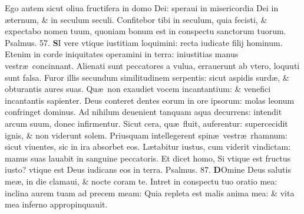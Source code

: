 \documentclass[a5paper,10pt]{book}
\def\ae{æ}
\begin{document}
\begin{multicols*}{2}
\newline \color{red} E\color{black}go autem sicut oliua fructifera in domo Dei: speraui in misericordia Dei in \ae ternum, \& in seculum seculi.
\newline \color{red} C\color{black}onfitebor tibi in seculum, quia fecisti, \& expectabo nomen tuum, quoniam bonum est in conspectu sanctorum tuorum. \quad \color{red} Psalmus. \hypertarget{ps57}{57.} \color{black}
\lettrine[lines=2]{\bfseries \color{red} S}{}I vere vtique iustitiam loquimini: recta iudicate filij hominum.
\newline \color{red} E\color{black}tenim in corde iniquitates operamini in terra: iniustitias manus vestr\ae \ concinnant.
\newline \color{red} A\color{black}lienati sunt peccatores a vulua, errauerunt ab vtero, loquuti sunt falsa.
\newline \color{red} F\color{black}uror illis secundum similitudinem serpentis: sicut aspidis surd\ae , \& obturantis aures suas.
\newline \color{red} Q\color{black}u\ae \ non exaudiet vocem incantantium: \& venefici incantantis sapienter.
\newline \color{red} D\color{black}eus conteret dentes eorum in ore ipsorum: molas leonum confringet dominus.
\newline \color{red} A\color{black}d nihilum deuenient tanquam aqua decurrens: intendit arcum suum, donec infirmentur.
\newline \color{red} S\color{black}icut cera, qu\ae \ fluit, auferentur: supercecidit ignis, \& non viderunt solem.
\newline \color{red} P\color{black}riusquam intellegerent spin\ae \ vestr\ae \ rhamnum: sicut viuentes, sic in ira absorbet eos.
\newline \color{red} L\color{black}\ae tabitur iustus, cum viderit vindictam: manus suas lauabit in sanguine peccatoris.
\newline \color{red} E\color{black}t dicet homo, Si vtique est fructus iusto? vtique est Deus iudicans eos in terra. \quad \color{red} Psalmus. \hypertarget{ps87}{87.} \color{black}
\vspace{-.25em}
\lettrine[lines=2]{\bfseries \color{red} D}{}Omine Deus salutis me\ae , in die clamaui, \& nocte coram te.
\newline \color{red} I\color{black}ntret in conspectu tuo oratio mea: inclina aurem tuam ad precem meam:
\newline \color{red} Q\color{black}uia repleta est malis anima mea: \& vita mea inferno appropinquauit.

\end{multicols*}
\end{document}
